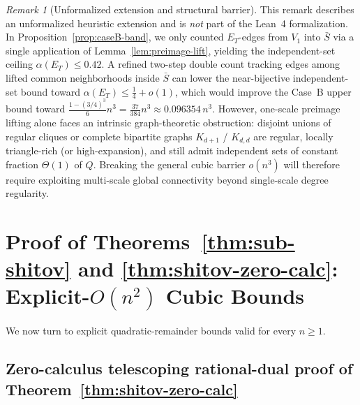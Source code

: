 \documentclass[11pt]{article}
\theoremstyle{definition}
\theoremstyle{remark}
\newtheorem{remark}[theorem]{Remark}
\begin{document}
\begin{remark}[Unformalized extension and structural barrier]\label{rem:unformalized-37-384}
This remark describes an unformalized heuristic extension and is \emph{not} part of the Lean~4 formalization. In Proposition~\ref{prop:caseB-band}, we only counted $E_T$-edges from $V_1$ into $\bar{S}$ via a single application of Lemma~\ref{lem:preimage-lift}, yielding the independent-set ceiling $\alpha(E_T) \le 0.42$. A refined two-step double count tracking edges among lifted common neighborhoods inside $\bar{S}$ can lower the near-bijective independent-set bound toward $\alpha(E_T) \le \frac{1}{4} + o(1)$, which would improve the Case~B upper bound toward $\frac{1 - (3/4)^3}{6} n^3 = \frac{37}{384} n^3 \approx 0.096354\, n^3$. However, one-scale preimage lifting alone faces an intrinsic graph-theoretic obstruction: disjoint unions of regular cliques or complete bipartite graphs $K_{d+1}$ / $K_{d,d}$ are regular, locally triangle-rich (or high-expansion), and still admit independent sets of constant fraction $\Theta(1)$ of $Q$. Breaking the general cubic barrier $o(n^3)$ will therefore require exploiting multi-scale global connectivity beyond single-scale degree regularity.
\end{remark}

\section{Proof of Theorems~\ref{thm:sub-shitov} and \ref{thm:shitov-zero-calc}: Explicit-\texorpdfstring{$O(n^2)$}{O(n\textasciicircum 2)} Cubic Bounds}\label{sec:sub-shitov}

We now turn to explicit quadratic-remainder bounds valid for every $n \ge 1$.

\subsection{Zero-calculus telescoping rational-dual proof of Theorem~\ref{thm:shitov-zero-calc}}\label{sec:shitov-dual}
\end{document}
